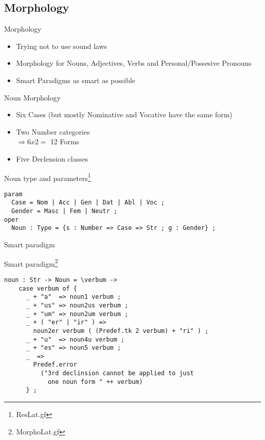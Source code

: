 \documentclass{beamer}
\begin{document}
\subsection{Morphology}
\begin{frame}{Morphology}
\begin{itemize}
  \item Trying not to use sound laws
  \item Morphology for Nouns, Adjectives, Verbs and Personal/Possesive Pronouns
  \item Smart Paradigms as smart as possible
\end{itemize}
\end{frame}
\begin{frame}[fragile]{Noun Morphology}
\begin{itemize}
  \item Six Cases (but mostly Nominative and Vocative have the same form)
  \item Two Number categories \\
  $\Rightarrow 6x2 = $ 12 Forms
  \item Five Declension classes
\end{itemize}
\begin{example}{Noun type and parameters\footnote{ResLat.gf}}
\begin{Verbatim}
param
  Case = Nom | Acc | Gen | Dat | Abl | Voc ;
  Gender = Masc | Fem | Neutr ;
oper
  Noun : Type = {s : Number => Case => Str ; g : Gender} ;
\end{Verbatim}
\end{example}
\end{frame}
\begin{frame}[fragile]{Smart paradigm}
\begin{example}{Smart paradigm\footnote{MorphoLat.gf}}
\begin{Verbatim}[label=Smart paradigm,fontsize=\scriptsize]
  noun : Str -> Noun = \verbum -> 
    case verbum of {
      _ + "a"  => noun1 verbum ;
      _ + "us" => noun2us verbum ;
      _ + "um" => noun2um verbum ;
      _ + ( "er" | "ir" ) => 
        noun2er verbum ( (Predef.tk 2 verbum) + "ri" ) ;
      _ + "u"  => noun4u verbum ;
      _ + "es" => noun5 verbum ;
      _  => 
        Predef.error 
          ("3rd declinsion cannot be applied to just 
            one noun form " ++ verbum)
      } ;
\end{Verbatim}
\end{example}
\end{frame}
\end{document}
